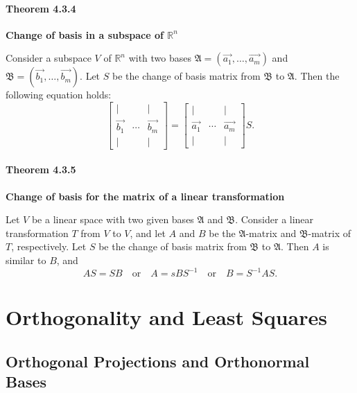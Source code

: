 \documentclass{report}
\begin{document}
\subsubsection*{Theorem 4.3.4}
\par\noindent\textbf{Change of basis in a subspace of $\mathbb{R}^{n}$}
\par\noindent Consider a subspace $V$ of $\mathbb{R}^{n}$ with two bases $\mathfrak{A}=(\vec{a_{1}},\ldots{},\vec{a_{m}})$ and $\mathfrak{B}=(\vec{b_{1}},\ldots{},\vec{b_{m}})$. Let $S$ be the change of basis matrix from $\mathfrak{B}$ to $\mathfrak{A}$. Then the following equation holds:
\[\left[\begin{array}{ccc}|&&|\\{} \vec{b_{1}}&\cdots{}&\vec{b_{m}}\\{} |&&|\end{array}\right]=\left[\begin{array}{ccc}|&&|\\{} \vec{a_{1}}&\cdots{}&\vec{a_{m}}\\{} |&&|\end{array}\right]S.\]
\subsubsection*{Theorem 4.3.5}
\par\noindent\textbf{Change of basis for the matrix of a linear transformation}
\par\noindent Let $V$ be a linear space with two given bases $\mathfrak{A}$ and $\mathfrak{B}$. Consider a linear transformation $T$ from $V$ to $V$, and let $A$ and $B$ be the $\mathfrak{A}$-matrix and $\mathfrak{B}$-matrix of $T$, respectively. Let $S$ be the change of basis matrix from $\mathfrak{B}$ to $\mathfrak{A}$. Then $A$ is similar to $B$, and
\[AS=SB\quad{}\textrm{or}\quad{}A=sBS^{-1}\quad{}\textrm{or}\quad{}B=S^{-1}AS.\]

\chapter{Orthogonality and Least Squares}

\section{Orthogonal Projections and Orthonormal Bases}
\end{document}
